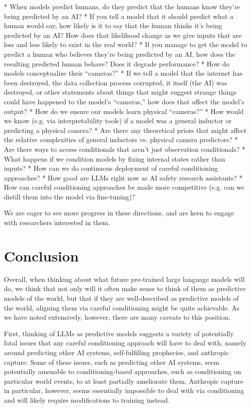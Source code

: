 {{* When models predict humans, do they predict that the humans know they're being predicted by an AI?
    * If you tell a model that it should predict what a human would say, how likely is it to say that the human thinks it's being predicted by an AI? How does that likelihood change as we give inputs that are less and less likely to exist in the real world?
    * If you manage to get the model to predict a human who believes they're being predicted by an AI, how does the resulting predicted human behave? Does it degrade performance?
* How do models conceptualize their ``cameras?''
    * If we tell a model that the internet has been destroyed, the data collection process corrupted, it itself (the AI) was destroyed, or other statements about things that might suggest strange things could have happened to the model's ``cameras,'' how does that affect the model's output?
* How do we ensure our models learn physical ``cameras?''
    * How would we know (e.g. via interpretability tools) if a model was a general inductor or predicting a physical camera?
    * Are there any theoretical priors that might affect the relative complexities of general inductors vs. physical camera predictors?
* Are there ways to access conditionals that aren't just observation conditionals?
    * What happens if we condition models by fixing internal states rather than inputs?
* How can we do continuous deployment of careful conditioning approaches?
    * How good are LLMs right now as AI safety research assistants?
    * How can careful conditioning approaches be made more competitive (e.g. can we distill them into the model via fine-tuning)?

We are eager to see more progress in these directions, and are keen to engage with researchers interested in them.


\section{Conclusion}
\label{sec:8}

Overall, when thinking about what future pre-trained large language models will do, we think that not only will it often make sense to think of them as predictive models of the world, but that if they are well-described as predictive models of the world, aligning them via careful conditioning might be quite achievable. As we have noted extensively, however, there are many caveats to this position.

First, thinking of LLMs as predictive models suggests a variety of potentially fatal issues that any careful conditioning approach will have to deal with, namely around predicting other AI systems, self-fulfilling prophecies, and anthropic capture. Some of these issues, such as predicting other AI systems, seem potentially amenable to conditioning-based approaches, such as conditioning on particular world events, to at least partially ameliorate them. Anthropic capture in particular, however, seems essentially impossible to deal with via conditioning and will likely require modifications to training instead.

}}
